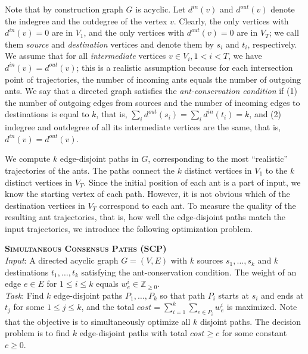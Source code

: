 \documentclass{llncs}
\begin{document}
Note that by construction graph $G$ is acyclic. Let $d^{in}(v)$ and
$d^{out}(v)$ denote the indegree and the outdegree of the vertex $v$.
Clearly, the only vertices with $d^{in}(v)=0$ are in $V_1$, and the
only vertices with $d^{out}(v)=0$ are in $V_T$; we call them
\emph{source} and \emph{destination} vertices and denote them by $s_i$ and $t_i$, respectively. We assume that
for all \emph{intermediate} vertices $v\in V_i, 1<i<T$, we have
$d^{in}(v)=d^{out}(v)$; this is a realistic assumption
because for each intersection point of trajectories,
the number of incoming ants equals the number of outgoing ants.
We say that a directed graph satisfies the {\em ant-conservation
condition} if (1) the number of outgoing edges from sources and the
number of incoming edges to destinations is equal to $k$, that is,
$\sum_i d^{out}(s_i) = \sum_i d^{in}(t_i) = k$, and
(2) indegree and outdegree of all its intermediate vertices
are the same, that is, $d^{in}(v)=d^{out}(v)$.

 We compute $k$ edge-disjoint paths in $G$,
corresponding to the most ``realistic'' trajectories of the ants. The
paths connect the $k$ distinct vertices in $V_1$ to the $k$ distinct
vertices in $V_T$. Since the initial position of each ant is a part of
input, we know the starting vertex of each path. However, it is not
obvious which of the destination vertices in $V_T$ correspond to each
ant. To measure the quality of the resulting ant
trajectories, that is, how well the edge-disjoint paths match the
input trajectories, we introduce the following optimization problem.

\noindent\textbf{\textsc{Simultaneous Consensus Paths} (SCP)}\\
\indent\emph{Input}: A directed acyclic graph $G=(V,E)$ with $k$
sources $s_1,\dots,s_k$ and $k$ destinations $t_1,\dots,t_k$
satisfying the ant-conservation condition.
The weight of an edge $e\in E$ for $1\le i \le k$ equals $w_e^i \in
\mathbb{Z}_{\ge 0}$.\\
\indent\emph{Task}: Find $k$ edge-disjoint paths $P_1,\dots,P_k$ so
that path $P_i$ starts at $s_i$ and ends at $t_j$ for some $1\le j \le k$,
and the total
$cost=\sum_{i=1}^k \sum_{e\in P_i} w_e^i$ is maximized. Note that the
objective is to simultaneously optimize all $k$ disjoint paths.
The decision problem is to find $k$ edge-disjoint paths with total $cost \ge c$ for some constant $c \ge 0$.
\end{document}
